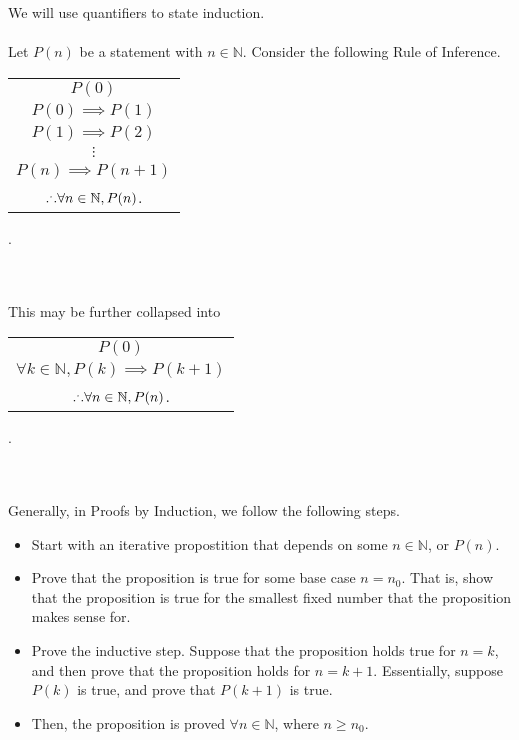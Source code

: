    We will use quantifiers to state induction.
    \\
    \\
    Let \(P(n)\) be a statement with \(n\in\mathbb{N}\). Consider the following Rule of Inference.
    \begin{center}
        \begin{tabular}{c}
            \hline
            \(P(0)\) \\
            \(P(0) \implies P(1)\) \\
            \(P(1) \implies P(2)\) \\
            \(\vdots\) \\
            \(P(n) \implies P(n+1)\) \\
            \hline
            \(.^.. \forall n\in\mathbb{N}, P(n)\). \\
            \hline
        \end{tabular}.
    \end{center}
    \pagebreak
    \vphantom
    \\
    \\
    This may be further collapsed into
    \begin{center}
        \begin{tabular}{c}
            \hline
            \(P(0)\) \\
            \(\forall k\in\mathbb{N}, P(k)\implies P(k+1)\) \\
            \hline
            \(.^.. \forall n\in\mathbb{N}, P(n)\). \\
            \hline
        \end{tabular}.
    \end{center}
    \vphantom
    \\
    \\
    Generally, in Proofs by Induction, we follow the following steps.
    \begin{itemize}
        \item Start with an iterative propostition that depends on some \(n\in\mathbb{N}\), or \(P(n)\).
        \item Prove that the proposition is true for some base case \(n=n_0\). That is, show that the proposition is true for the smallest fixed number that the proposition makes sense for.
        \item Prove the inductive step. Suppose that the proposition holds true for \(n=k\), and then prove that the proposition holds for \(n=k+1\). Essentially, suppose \(P(k)\) is true, and prove that \(P(k+1)\) is true.
        \item Then, the proposition is proved \(\forall n\in\mathbb{N}\), where \(n \geq n_0\).
    \end{itemize}
